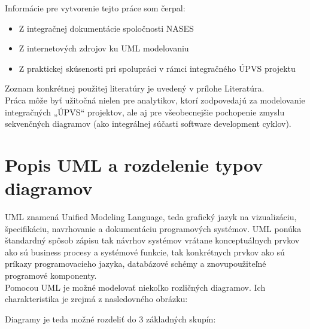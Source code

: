 \documentclass[10pt,twoside,slovak,a4paper]{article}
\begin{document}
Informácie pre vytvorenie tejto práce som čerpal:

\begin{itemize}
\item Z integračnej dokumentácie spoločnosti NASES
\item Z internetových zdrojov ku UML modelovaniu
\item Z praktickej skúsenosti pri spolupráci v rámci integračného ÚPVS projektu
\end{itemize}
Zoznam konkrétnej použitej literatúry je uvedený v prílohe Literatúra.\\

Práca môže byť užitočná nielen pre analytikov, ktorí zodpovedajú za modelovanie integračných „ÚPVS“ projektov, ale aj pre všeobecnejšie pochopenie zmyslu sekvenčných diagramov (ako integrálnej súčasti software development cyklov).


\section{Popis UML a rozdelenie typov diagramov} \label{Popis}

UML znamená Unified Modeling Language, teda grafický jazyk na vizualizáciu, špecifikáciu, navrhovanie a dokumentáciu programových systémov. UML ponúka štandardný spôsob zápisu tak návrhov systémov vrátane konceptuálnych prvkov ako sú business procesy a systémové funkcie, tak konkrétnych prvkov ako sú príkazy programovacieho jazyka, databázové schémy a znovupoužiteľné programové komponenty.\cite{WIKI}\\

Pomocou UML je možné modelovať niekoľko rozličných diagramov. Ich charakteristika je zrejmá z nasledovného obrázku\cite{UMLUni}:



 Diagramy je teda možné rozdeliť do 3 základných skupín\cite{WIKI}:
\end{document}
